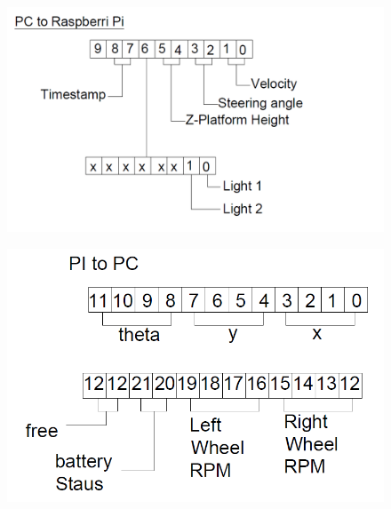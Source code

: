 \begin{figure}
	
	\begin{minipage}[t]{0.5\textwidth}
		\includegraphics[width=\linewidth,keepaspectratio]{Chapter5/fig/bitconfig}
		\label{fig:sentBytes} 
	\end{minipage}
\hfill
   \begin{minipage}[t]{0.5\textwidth}
   		\includegraphics[width=\linewidth,keepaspectratio]{Chapter5/fig/bitconfig2}
   		\label{fig:recvBytes} 
   \end{minipage}
	
\end{figure}

